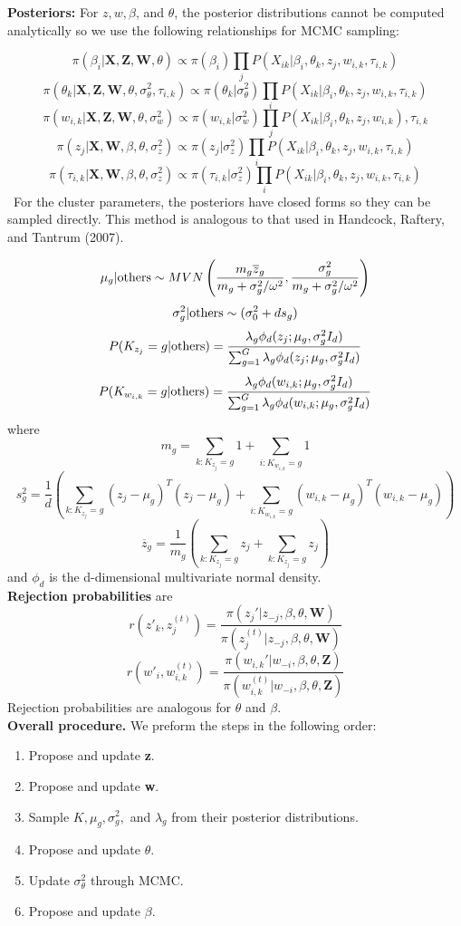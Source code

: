 \documentclass[12pt]{article}
\newcommand{\tx}[1]{\textnormal{#1}}
\begin{document}
 \textbf{Posteriors:}  For $z,w,\beta$, and $\theta$, the posterior distributions cannot be computed analytically so we use the following relationships for MCMC sampling:
 
 $$\pi(\beta_i|\textbf{X},\textbf{Z},\textbf{W},\theta)\propto \pi(\beta_i)\prod_{j}P(X_{ik}|\beta_i,\theta_k,z_j,w_{i,k},\tau_{i,k})$$  
  $$\pi(\theta_k|\textbf{X},\textbf{Z},\textbf{W},\theta,\sigma_\theta^2,\tau_{i,k})\propto \pi(\theta_k|\sigma_\theta^2)\prod_{i}P(X_{ik}|\beta_i,\theta_k,z_j,w_{i,k},\tau_{i,k})$$ 
   $$\pi(w_{i,k}|\textbf{X},\textbf{Z},\textbf{W},\theta,\sigma_w^2)\propto \pi(w_{i,k}|\sigma_w^2)\prod_{j}P(X_{ik}|\beta_i,\theta_k,z_j,w_{i,k}),\tau_{i,k}$$ 
    $$\pi(z_j|\textbf{X},\textbf{W},\beta,\theta,\sigma_z^2)\propto \pi(z_j|\sigma_z^2)\prod_{i}P(X_{ik}|\beta_i,\theta_k,z_j,w_{i,k},\tau_{i,k})$$ 
        $$\pi(\tau_{i,k}|\textbf{X},\textbf{W},\beta,\theta,\sigma_z^2)\propto \pi(\tau_{i,k}|\sigma_z^2)\prod_{i}P(X_{ik}|\beta_i,\theta_k,z_j,w_{i,k},\tau_{i,k})$$ \
    For the cluster parameters, the posteriors have closed forms so they can be sampled directly. This method is analogous to that used in Handcock, Raftery, and Tantrum (2007).
    
    $$\mu_{g}|\tx{others}\sim MVN\left(\frac{m_g\overline{z}_g}{m_g+\sigma_g^2/\omega^2},\frac{\sigma_g^2}{m_g+\sigma_g^2/\omega^2}\right)$$ $$\sigma_g^2|\tx{others}\sim (\sigma_0^2+ds_g)$$ $$P(K_{z_j}=g|\tx{others})=\frac{\lambda_{g}\phi_d(z_j;\mu_{g},\sigma_{g}^2I_d)}{\sum_{g=1}^{G}\lambda_{g}\phi_d(z_j;\mu_{g},\sigma_{g}^2I_d)}$$ $$P(K_{w_{i,k}}=g|\tx{others})=\frac{\lambda_{g}\phi_d(w_{i,k};\mu_{g},\sigma_{g}^2I_d)}{\sum_{g=1}^{G}\lambda_{g}\phi_d(w_{i,k};\mu_{g},\sigma_{g}^2I_d)}$$where $$m_g=\sum_{k:K_{z_j}=g}1+\sum_{i:K_{w_{i,k}}=g}1$$ $$s_g^2=\frac{1}{d}\left(\sum_{k:K_{z_j}=g}(z_j-\mu_g)^T(z_j-\mu_g)+\sum_{i:K_{w_{i,k}}=g}(w_{i,k}-\mu_g)^T(w_{i,k}-\mu_g)\right)$$ $$\overline{z}_g=\frac{1}{m_g}\left(\sum_{k:K_{z_j}=g}z_j+\sum_{k:K_{z_j}=g}z_j\right)$$ and $\phi_d$ is the d-dimensional multivariate normal density.\\ 
     
  \textbf{Rejection probabilities} are  $$r(z'_k,z_j^{(t)})=\frac{\pi(z_j'|z_{-j},\beta,\theta,\textbf{W})}{\pi(z_j^{(t)}|z_{-j},\beta,\theta,\textbf{W})}$$ $$r(w'_i,w_{i,k}^{(t)})=\frac{\pi(w_{i,k}'|w_{-i},\beta,\theta,\textbf{Z})}{\pi(w_{i,k}^{(t)}|w_{-i},\beta,\theta,\textbf{Z})}$$
Rejection probabilities are analogous for $\theta$ and $\beta$.\\

\textbf{Overall procedure.} We preform the steps in the following order:

\begin{enumerate}
	\item Propose and update \textbf{z}. 
	\item Propose and update \textbf{w}.
	\item Sample $K,\mu_{g},\sigma_{g}^2,$ and $\lambda_{g}$ from their posterior distributions.
	\item Propose and update $\theta$.
	\item Update $\sigma_\theta^2$ through MCMC.
	\item Propose and update $\beta$.
\end{enumerate}
\end{document}
